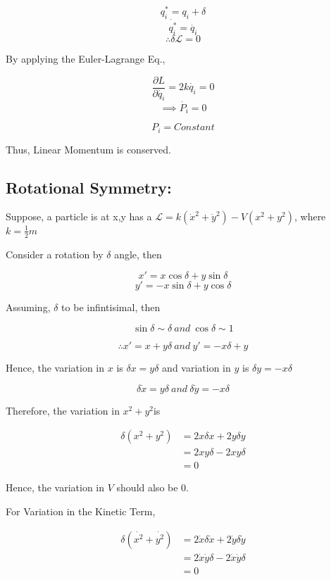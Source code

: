 \documentclass[a4paper]{article}
\newcommand{\Lagr}{\mathcal{L}}
\newcommand{\pdt}[2]{\frac{\partial #1}{\partial #2}}
\newcommand{\half}{\frac{1}{2}}
\begin{document}
			$$ q_i^* = q_i + \delta $$
			$$ \dot{q_i^*} = \dot{q_i} $$
			$$\therefore \delta \Lagr = 0 $$

			By applying the Euler-Lagrange Eq., 

			$$ \pdt{L}{\dot{q_i}} = 2k\dot{q_i} = 0 $$
			$$\implies \dot{P_i} = 0 $$

			$$ P_i = Constant $$

			Thus, Linear Momentum is conserved.

		\subsection*{Rotational Symmetry: }

			\noindent

			Suppose, a particle is at x,y has a $\Lagr = k (\dot{x}^2 + \dot{y}^2) - V(x^2 + y^2)$, where $ k = \half m $ 

			Consider a rotation by $\delta$ angle, then

			$$ x' = x\cos{\delta} + y\sin{\delta} $$
			$$ y' = -x\sin{\delta} + y\cos{\delta} $$

			Assuming, $\delta$ to be infintisimal, then

			$$ \sin{\delta} \sim \delta\ and\ \cos{\delta} \sim 1 $$

			$$\therefore x' = x + y\delta\ and\ y' = -x\delta + y $$

			Hence, the variation in $x$ is $\delta x = y \delta$ and variation in $y$ is $\delta y = -x \delta $

			$$ \delta \dot{x} = y \delta\ and\ \delta \dot{y} = - x \delta $$

			Therefore, the variation in $x^2 + y^2$is
			
			\begin{equation}
				\begin{split}	
					\delta (x^2 + y^2) & = 2 x \delta x + 2y \delta y \\
					&= 2 x y \delta - 2 x y \delta  \\
					& = 0
				\end{split}
			\end{equation}
			
			Hence, the variation in $V$ should also be $0$.

			For Variation in the Kinetic Term,

			\begin{equation}
				\begin{split}	
					\delta (\dot{x^2} + \dot{y^2}) & = 2 \dot{x} \delta \dot{x} + 2 \dot{y} \delta \dot{y} \\
					& = 2 \dot{x} \dot{y} \delta - 2 \dot{x} \dot{y} \delta \\
					& = 0
				\end{split}
			\end{equation}
			
\end{document}
